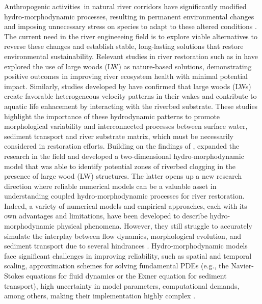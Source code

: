 \documentclass[draft,linenumbers,onecolumn]{agujournal2019} %
\begin{document}
Anthropogenic activities in natural river corridors have significantly modified hydro-morphodynamic processes, resulting in permanent environmental changes and imposing unnecessary stress on species to adapt to these altered conditions \cite{grooten2018living, pasternack2020river}. The current need in the river engineeeing field is to explore viable alternatives to reverse these changes and establish stable, long-lasting solutions that restore environmental sustainability. Relevant studies in river restoration such as in  have explored the use of large woods (LW) as nature-based solutions, demonstrating positive outcomes in improving river ecosystem health with minimal potential impact. Similarly, studies developed by  have confirmed that large woods (LWs) create favorable heterogeneous velocity patterns in their wakes and contribute to aquatic life enhacement by interacting with the riverbed substrate. These studies highlight the importance of these hydrodynamic patterns to promote morphological variability and interconnected processes between surface water, sediment transport and river substrate matrix, which must be necessarily considered in restoration efforts.  Building on the findings of ,  expanded the research in the field and developed a two-dimensional hydro-morphodynamic model that was able to identify potential zones of riverbed clogging in the presence of large wood (LW) structures. The latter opens up a new research direction where reliable numerical models can be a valuable asset in understanding coupled hydro-morphodynamic processes for river restoration. Indeed, a variety of numerical models and empirical approaches, each with its own advantages and limitations, have been developed to describe hydro-morphodynamic physical phenomena. However, they still struggle to accurately simulate the interplay between flow dynamics, morphological evolution, and sediment transport due to several hindrances \cite{nones2019numerical,kuhanestani2022hydraulic}. Hydro-morphodynamic models face significant challenges in improving reliability, such as spatial and temporal scaling, approximation schemes for solving fundamental PDEs (e.g., the Navier-Stokes equations for fluid dynamics or the Exner equation for sediment transport), high uncertainty in model parameters, computational demands, among others, making their implementation highly complex \cite{williams2016numerical,yassine2023numerical}.
\end{document}
